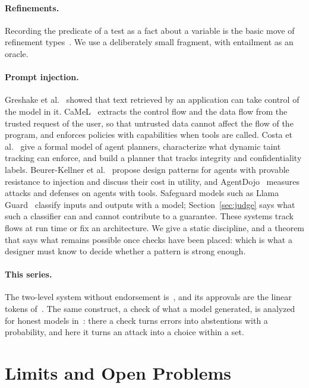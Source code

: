 \documentclass[acmsmall,nonacm,screen]{acmart}
\begin{document}
\paragraph{Refinements.} Recording the predicate of a test as a fact about a variable is the
basic move of refinement types~\cite{freeman1991,rondon2008}. We use a deliberately small
fragment, with entailment as an oracle.

\paragraph{Prompt injection.} Greshake et al.~\cite{greshake2023} showed that text retrieved
by an application can take control of the model in it. CaMeL~\cite{debenedetti2025} extracts
the control flow and the data flow from the trusted request of the user, so that untrusted
data cannot affect the flow of the program, and enforces policies with capabilities when
tools are called. Costa et al.~\cite{costa2025} give a formal model of agent planners,
characterize what dynamic taint tracking can enforce, and build a planner that tracks
integrity and confidentiality labels. Beurer-Kellner et al.~\cite{beurerkellner2025} propose
design patterns for agents with provable resistance to injection and discuss their cost in
utility, and AgentDojo~\cite{debenedetti2024} measures attacks and defenses on agents with
tools. Safeguard models such as Llama Guard~\cite{inan2023} classify inputs and outputs with
a model; Section~\ref{sec:judge} says what such a classifier can and cannot contribute to a
guarantee. These systems track flows at run time or fix an architecture. We give a static
discipline, and a theorem that says what remains possible once checks have been placed:
which is what a designer must know to decide whether a pattern is strong enough.

\paragraph{This series.} The two-level system without endorsement is~\cite{tpp5}, and its
approvals are the linear tokens of~\cite{tpp4}. The same construct, a check of what a model
generated, is analyzed for honest models in~\cite{tpp3}: there a check turns errors into
abstentions with a probability, and here it turns an attack into a choice within a set.

\section{Limits and Open Problems}
\label{sec:limits}
\end{document}
